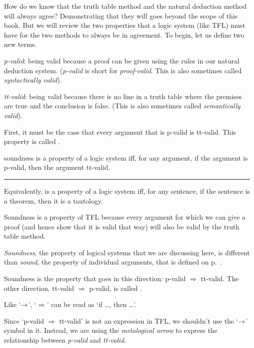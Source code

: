 How do we know that the truth table method and the natural deduction method will always agree? Demonstrating that they will goes beyond the scope of this book. But we will review the two properties that a logic system (like TFL) must have for the two methods to always be in agreement.  To begin, let us define two new terms. 
\begin{earg}
\item[] \textit{p-valid}: being valid because a proof can be given using the rules in our natural deduction system. (\textit{p-valid} is short for \textit{proof-valid}. This is also sometimes called \textit{syntactically valid}). 
\item[] \textit{tt-valid}: being valid because there is no line in a truth table where the premises are true and the conclusion is false. (This is also sometimes called \textit{semantically valid}).
\end{earg}
First, it must be the case that every argument that is p-valid is tt-valid. This property is called .

\begin{factboxy}{soundness}\label{def:Soundness}
 is a property of a logic system iff, for any argument, if the argument is p-valid, then the argument tt-valid.
\medskip
\hrule
\medskip
Equivalently,  is a property of a logic system iff, for any sentence, if the sentence is a theorem, then it is a tautology. 
\end{factboxy}

\noindent Soundness is a property of TFL because every argument for which we can give a proof (and hence show that it is valid that way) will also be valid by the truth table method.


\begin{notebox}
\textit{Soundness}, the property of logical systems that we are discussing here, is different than \textit{sound}, the property of individual arguments, that is defined on p.~\pageref{def-sound-arg}.
\end{notebox}

Soundness is the property that goes in this direction: p-valid $\Rightarrow$ tt-valid. The other direction, tt-valid $\Rightarrow$ p-valid, is called .

\begin{notebox}
Like `$\rightarrow$', `$\Rightarrow$' can be read as `if \ldots, then \ldots'. 
\smallskip

Since `p-valid $\Rightarrow$ tt-valid' is not an expression in TFL, we shouldn't use the `$\rightarrow$' symbol in it. Instead, we are using the \textit{metalogical arrow} to express the relationship between \textit{p-valid} and \textit{tt-valid}.
\end{notebox}

